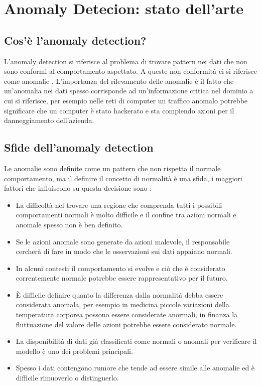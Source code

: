 
\chapter{Anomaly Detecion: stato dell'arte}

\section{Cos'è l'anomaly detection?}


L'anomaly detection si riferisce al problema di trovare pattern nei dati che non sono conformi al comportamento aspettato. A queste non conformità ci si riferisce come anomalie \cite{anomaly_detection_survey_3}. L'importanza del rilevamento delle anomalie è il fatto che un'anomalia nei dati spesso corrisponde ad un'informazione critica nel dominio a cui si riferisce, per esempio nelle reti di computer un traffico anomalo potrebbe significare che un computer è stato hackerato e sta compiendo azioni per il danneggiamento dell'azienda.

\section{Sfide dell'anomaly detection}

Le anomalie sono definite come un pattern che non rispetta il normale comportamento, ma il definire il concetto di normalità è una sfida, i maggiori fattori che influiscono su questa decisione sono \cite{anomaly_detection_survey_3}:

\begin{itemize}
    \item La difficoltà nel trovare una regione che comprenda tutti i possibili comportamenti normali è molto difficile e il confine tra azioni normali e anomale spesso non è ben definito.
    \item Se le azioni anomale sono generate da azioni malevole, il responsabile cercherà di fare in modo che le osservazioni sui dati appaiano normali.
    \item In alcuni contesti il comportamento si evolve e ciò che è considerato correntemente normale potrebbe essere rappresentativo per il futuro.
    \item È difficile definire quanto la differenza dalla normalità debba essere considerata anomala, per esempio in medicina piccole variazioni della temperatura corporea possono essere considerate anormali, in finanza la fluttuazione del valore delle azioni potrebbe essere considerato normale.
    \item La disponibilità di dati già classificati come normali o anomali per verificare il modello è uno dei problemi principali.
    \item Spesso i dati contengono rumore che tende ad essere simile alle anomalie ed è difficile rimuoverlo o distinguerlo.
\end{itemize}


